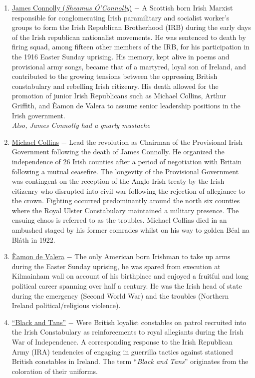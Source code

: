 \documentclass[12pt]{article}
\begin{document}
\begin{flushleft}
\begin{enumerate}

\item  \underline{James Connolly (\emph{Sheamus \'O'Connolly})} $-$ A Scottish born Irish Marxist responsible for conglomerating Irish paramilitary and socialist worker's groups to form the Irish Republican Brotherhood (IRB) during the early days of the Irish republican nationalist movements. He was sentenced to death by firing squad, among fifteen other members of the IRB, for his participation in the 1916 Easter Sunday uprising. His memory, kept alive in poems and provisional army songs, became that of a martyred, loyal son of Ireland, and contributed to the growing tensions between the oppressing British constabulary and rebelling Irish citizenry. His death allowed for the promotion of junior Irish Republicans such as Michael Collins, Arthur Griffith, and \`Eamon de Valera to assume senior leadership positions in the Irish government. \\\vspace{8pt}\emph{Also, James Connolly had a gnarly mustache}

\item \underline{Michael Collins} $-$ Lead the revolution as Chairman of the Provisional Irish Government following the death of James Connolly. He organized the independence of 26 Irish counties after a period of negotiation with Britain following a mutual ceasefire. The longevity of the Provisional Government was contingent on the reception of the Anglo-Irish treaty by the Irish citizenry who disrupted into civil war following the rejection of allegiance to the crown. Fighting occurred predominantly around the north six counties where the Royal Ulster Constabulary maintained a military presence. The ensuing chaos is referred to as the troubles. Michael Collins died in an ambushed staged by his former comrades whilst on his way to golden B\'eal na Bl\'ath in 1922.

\item \underline{\`Eamon de Valera} $-$ The only American born Irishman to take up arms during the Easter Sunday uprising, he was spared from execution at  Kilmainham wall on account of his birthplace and enjoyed a fruitful and long political career spanning over half a century. He was the Irish head of state during the emergency (Second World War) and the troubles (Northern Ireland political/religious violence).

\item \underline{``Black and Tans''} $-$ Were British loyalist constables on patrol recruited into the Irish Constabulary as reinforcements to royal allegiants during the Irish War of Independence. A corresponding response to the Irish Republican Army (IRA) tendencies of engaging in guerrilla tactics against stationed British constables in Ireland. The term ``\emph{Black and Tans}'' originates from the coloration of their uniforms.


\end{enumerate}
\end{flushleft}
\end{document}
